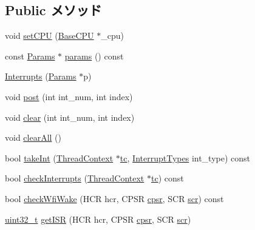 \subsection*{Public メソッド}
\begin{DoxyCompactItemize}
\item 
void \hyperlink{classArmISA_1_1Interrupts_a2ab8c6aed9969bc58d6aa2427d442cc4}{setCPU} (\hyperlink{classBaseCPU}{BaseCPU} $\ast$\_\-cpu)
\item 
const \hyperlink{classArmISA_1_1Interrupts_a747dfcc35968d9e2b82998fae6408d6a}{Params} $\ast$ \hyperlink{classArmISA_1_1Interrupts_acd3c3feb78ae7a8f88fe0f110a718dff}{params} () const 
\item 
\hyperlink{classArmISA_1_1Interrupts_a3d148759405b99148e0c34750966edb1}{Interrupts} (\hyperlink{classArmISA_1_1Interrupts_a747dfcc35968d9e2b82998fae6408d6a}{Params} $\ast$p)
\item 
void \hyperlink{classArmISA_1_1Interrupts_a24c6c4fbdc0605bcd015ce06f194e4b4}{post} (int int\_\-num, int index)
\item 
void \hyperlink{classArmISA_1_1Interrupts_af60c3484087379d0330467d77f6cbaae}{clear} (int int\_\-num, int index)
\item 
void \hyperlink{classArmISA_1_1Interrupts_a798729dca95209ecdc609807a653a2bf}{clearAll} ()
\item 
bool \hyperlink{classArmISA_1_1Interrupts_a50dda1dd4fbbbf90b50f55cc0a712264}{takeInt} (\hyperlink{classThreadContext}{ThreadContext} $\ast$\hyperlink{namespaceArmISA_a5aff829af55e65b802d83dfcef4e9dd0}{tc}, \hyperlink{namespaceArmISA_acdad6d81b9a94402ce3979d531ae4f40}{InterruptTypes} int\_\-type) const 
\item 
bool \hyperlink{classArmISA_1_1Interrupts_af3c66fb49fec598cf78aaec29d764952}{checkInterrupts} (\hyperlink{classThreadContext}{ThreadContext} $\ast$\hyperlink{namespaceArmISA_a5aff829af55e65b802d83dfcef4e9dd0}{tc}) const 
\item 
bool \hyperlink{classArmISA_1_1Interrupts_a0b7f3ea5e340cd06e8dc803865a6083a}{checkWfiWake} (HCR hcr, CPSR \hyperlink{namespaceArmISA_ad377bf9b9c48f8cf3e8e918e0847b1fe}{cpsr}, SCR \hyperlink{namespaceArmISA_ace0bf26677706ecff809bd4c76d33c8c}{scr}) const 
\item 
\hyperlink{Type_8hh_a435d1572bf3f880d55459d9805097f62}{uint32\_\-t} \hyperlink{classArmISA_1_1Interrupts_a4c1c835071d8dcd4b0006a8665d11dde}{getISR} (HCR hcr, CPSR \hyperlink{namespaceArmISA_ad377bf9b9c48f8cf3e8e918e0847b1fe}{cpsr}, SCR \hyperlink{namespaceArmISA_ace0bf26677706ecff809bd4c76d33c8c}{scr})

\end{DoxyCompactItemize}
